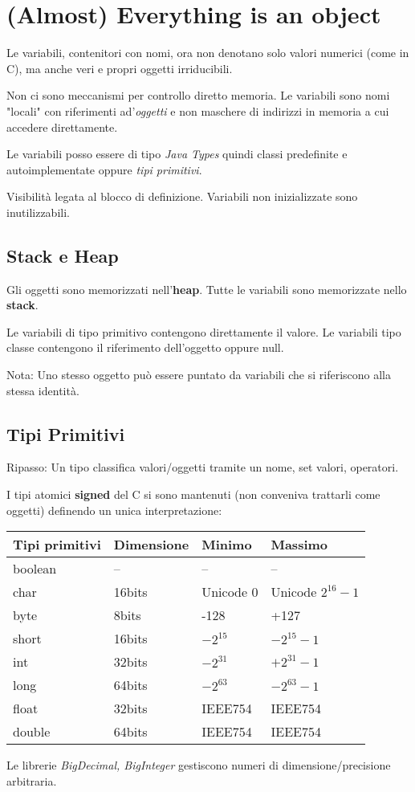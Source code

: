 \section{(Almost) Everything is an object}
Le variabili, contenitori con nomi, ora non denotano solo valori numerici (come in C), ma anche veri e propri oggetti irriducibili.

Non ci sono meccanismi per controllo diretto memoria. Le variabili sono nomi "locali" con riferimenti ad'\textit{oggetti} e non maschere di indirizzi in memoria a cui accedere direttamente.

Le variabili posso essere di tipo \textit{Java Types} quindi classi predefinite e autoimplementate oppure \textit{tipi primitivi}.

Visibilità legata al blocco di definizione.
Variabili non inizializzate sono inutilizzabili.

\subsection{Stack e Heap}
Gli oggetti sono memorizzati nell'\textbf{heap}. Tutte le variabili sono memorizzate nello \textbf{stack}.

Le variabili di tipo primitivo contengono direttamente il valore. Le variabili tipo classe contengono il riferimento dell'oggetto oppure null.

Nota: Uno stesso oggetto può essere puntato da variabili che si riferiscono alla stessa identità.

\subsection{Tipi Primitivi}
Ripasso: Un tipo classifica valori/oggetti tramite un nome, set valori, operatori.

I tipi atomici \textbf{signed} del C si sono mantenuti (non conveniva trattarli come oggetti) definendo un unica interpretazione:
\begin{center}
	\begin{tabular}{llll}
		\hline
		Tipi  primitivi & Dimensione & Minimo & Massimo \\
		\hline
		boolean & -- & -- & -- \\
		char & 16bits & Unicode 0 & Unicode $2^{16}-1$ \\
		byte & 8bits & -128 & +127 \\
		short & 16bits & $-2^{15}$ & $-2^{15}-1$ \\
		int & 32bits & $-2^{31}$& $+2^{31}-1$ \\
		long & 64bits  & $-2^{63}$& $-2^{63}-1$\\
		float & 32bits & IEEE754 & IEEE754 \\
		double & 64bits & IEEE754 & IEEE754 \\
		\hline
	\end{tabular}

	{\tiny Le librerie \textit{BigDecimal, BigInteger} gestiscono numeri di dimensione/precisione arbitraria.}
\end{center}

